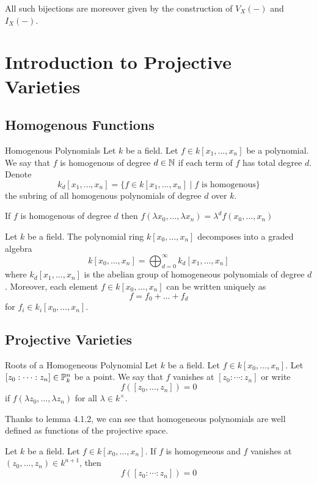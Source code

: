 \documentclass[a4paper]{article}
\begin{document}
All such bijections are moreover given by the construction of $V_X(-)$ and $I_X(-)$. 

\pagebreak
\section{Introduction to Projective Varieties}
\subsection{Homogenous Functions}
\begin{defn}{Homogenous Polynomials}{} Let $k$ be a field. Let $f\in k[x_1,\dots,x_n]$ be a polynomial. We say that $f$ is homogenous of degree $d\in\mathbb{N}$ if each term of $f$ has total degree $d$. Denote $$k_d[x_1,\dots,x_n]=\{f\in k[x_1,\dots,x_n]\;|\;f\text{ is homogenous}\}$$ the subring of all homogenous polynomials of degree $d$ over $k$. 
\end{defn}

\begin{lmm}{}{} If $f$ is homogenous of degree $d$ then $f(\lambda x_0,\dots,\lambda x_n)=\lambda^df(x_0,\dots,x_n)$
\end{lmm}

\begin{prp}{}{} Let $k$ be a field. The polynomial ring $k[x_0,\dots,x_n]$ decomposes into a graded algebra $$k[x_0,\dots,x_n]=\bigoplus_{d=0}^\infty k_d[x_1,\dots,x_n]$$ where $k_d[x_1,\dots,x_n]$ is the abelian group of homogeneous polynomials of degree $d$. Moreover, each element $f\in k[x_0,\dots,x_n]$ can be written uniquely as $$f=f_0+\dots+f_d$$ for $f_i\in k_i[x_0,\dots,x_n]$. 
\end{prp}

\subsection{Projective Varieties}
\begin{defn}{Roots of a Homogeneous Polynomial}{} Let $k$ be a field. Let $f\in k[x_0,\dots,x_n]$. Let $[z_0:\cdots:z_n]\in\mathbb{P}_k^n$ be a point. We say that $f$ vanishes at $[z_0:\cdots:z_n]$ or write $$f([z_0,\dots,z_n])=0$$ if $f(\lambda z_0,\dots,\lambda z_n)$ for all $\lambda\in k^\times$. 
\end{defn}

Thanks to lemma 4.1.2, we can see that homogeneous polynomials are well defined as functions of the projective space. 

\begin{lmm}{}{} Let $k$ be a field. Let $f\in k[x_0,\dots,x_n]$. If $f$ is homogeneous and $f$ vanishes at $(z_0,\dots,z_n)\in k^{n+1}$, then $$f([z_0:\cdots:z_n])=0$$
\end{lmm}
\end{document}
